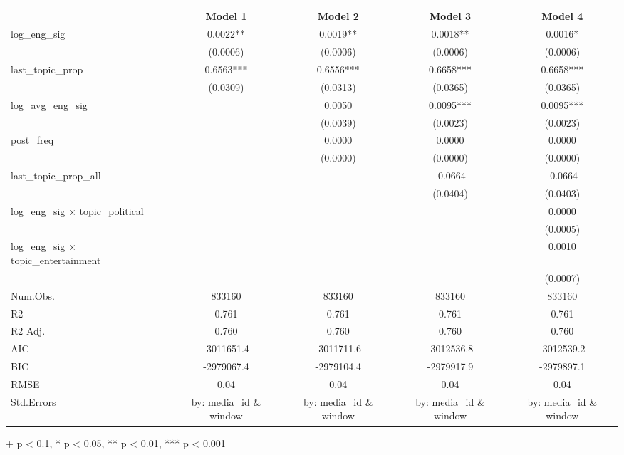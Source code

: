 \setlength{\LTpost}{0mm}
\begin{longtable}{lcccc}
\toprule
  & Model 1 & Model 2 & Model 3 & Model 4 \\ 
\midrule
log\_eng\_sig & 0.0022** & 0.0019** & 0.0018** & 0.0016* \\ 
 & (0.0006) & (0.0006) & (0.0006) & (0.0006) \\ 
last\_topic\_prop & 0.6563*** & 0.6556*** & 0.6658*** & 0.6658*** \\ 
 & (0.0309) & (0.0313) & (0.0365) & (0.0365) \\ 
log\_avg\_eng\_sig &  & 0.0050 & 0.0095*** & 0.0095*** \\ 
 &  & (0.0039) & (0.0023) & (0.0023) \\ 
post\_freq &  & 0.0000 & 0.0000 & 0.0000 \\ 
 &  & (0.0000) & (0.0000) & (0.0000) \\ 
last\_topic\_prop\_all &  &  & -0.0664 & -0.0664 \\ 
 &  &  & (0.0404) & (0.0403) \\ 
log\_eng\_sig × topic\_political &  &  &  & 0.0000 \\ 
 &  &  &  & (0.0005) \\ 
log\_eng\_sig × topic\_entertainment &  &  &  & 0.0010 \\ 
 &  &  &  & (0.0007) \\ 
Num.Obs. & 833160 & 833160 & 833160 & 833160 \\ 
R2 & 0.761 & 0.761 & 0.761 & 0.761 \\ 
R2 Adj. & 0.760 & 0.760 & 0.760 & 0.760 \\ 
AIC & -3011651.4 & -3011711.6 & -3012536.8 & -3012539.2 \\ 
BIC & -2979067.4 & -2979104.4 & -2979917.9 & -2979897.1 \\ 
RMSE & 0.04 & 0.04 & 0.04 & 0.04 \\ 
Std.Errors & by: media\_id \& window & by: media\_id \& window & by: media\_id \& window & by: media\_id \& window \\ 
\bottomrule
\end{longtable}
\begin{minipage}{\linewidth}
+ p < 0.1, * p < 0.05, ** p < 0.01, *** p < 0.001\\
\end{minipage}

